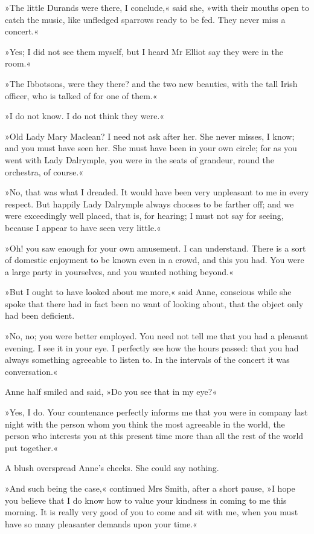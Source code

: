 »The little Durands were there, I conclude,« said she, »with their mouths open to catch the music, like unfledged sparrows ready to be fed. They never miss a concert.«

»Yes; I did not see them myself, but I heard Mr Elliot say they were in the room.«

»The Ibbotsons, were they there? and the two new beauties, with the tall Irish officer, who is talked of for one of them.«

»I do not know. I do not think they were.«

»Old Lady Mary Maclean? I need not ask after her. She never misses, I know; and you must have seen her. She must have been in your own circle; for as you went with Lady Dalrymple, you were in the seats of grandeur, round the orchestra, of course.«

»No, that was what I dreaded. It would have been very unpleasant to me in every respect. But happily Lady Dalrymple always chooses to be farther off; and we were exceedingly well placed, that is, for hearing; I must not say for seeing, because I appear to have seen very little.«

»Oh! you saw enough for your own amusement. I can understand. There is a sort of domestic enjoyment to be known even in a crowd, and this you had. You were a large party in yourselves, and you wanted nothing beyond.«

»But I ought to have looked about me more,« said Anne, conscious while she spoke that there had in fact been no want of looking about, that the object only had been deficient.

»No, no; you were better employed. You need not tell me that you had a pleasant evening. I see it in your eye. I perfectly see how the hours passed: that you had always something agreeable to listen to. In the intervals of the concert it was conversation.«

Anne half smiled and said, »Do you see that in my eye?«

»Yes, I do. Your countenance perfectly informs me that you were in company last night with the person whom you think the most agreeable in the world, the person who interests you at this present time more than all the rest of the world put together.«

A blush overspread Anne's cheeks. She could say nothing.

»And such being the case,« continued Mrs Smith, after a short pause, »I hope you believe that I do know how to value your kindness in coming to me this morning. It is really very good of you to come and sit with me, when you must have so many pleasanter demands upon your time.«

